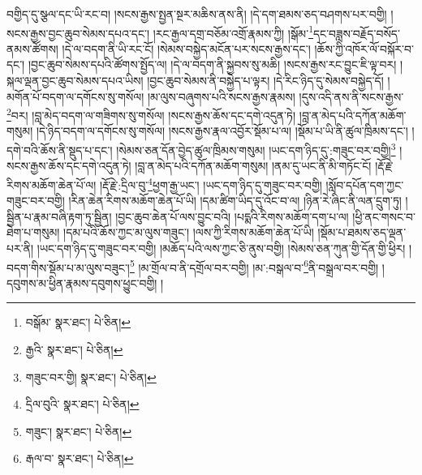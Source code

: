 བགྱིད་དུ་སྩལ་དང་ཡི་རང་བ། །སངས་རྒྱས་སྤྱན་སྔར་མཆིས་ནས་ནི། །དེ་དག་ཐམས་ཅད་བཤགས་པར་བགྱི། །སངས་རྒྱས་བྱང་ཆུབ་སེམས་དཔའ་དང་། །རང་རྒྱལ་དགྲ་བཅོམ་འགྲོ་རྣམས་ཀྱི། །སྒོམ་\footnote{བསྒོམ་  སྣར་ཐང་།  པེ་ཅིན། }དང་བཟླས་བརྗོད་བསོད་ནམས་ཚོགས། །དེ་ལ་བདག་ནི་ཡི་རང་ངོ། །སེམས་བསྐྱེད་མངོན་པར་སངས་རྒྱས་དང་། །ཆོས་ཀྱི་འཁོར་ལོ་བསྐོར་བ་དང་། །བྱང་ཆུབ་སེམས་དཔའི་ཚོགས་སྤྱོད་ལ། །དེ་ལ་བདག་ནི་སྐྱབས་སུ་མཆི། །སངས་རྒྱས་རང་བྱུང་ཇི་ལྟ་བར། །སྐལ་ལྡན་བྱང་ཆུབ་སེམས་དཔའ་ཡིས། །བྱང་ཆུབ་སེམས་ནི་བསྐྱེད་པ་ལྟར། །དེ་རིང་ཉིད་དུ་སེམས་བསྐྱེད་དོ། །མགོན་པོ་བདག་ལ་དགོངས་སུ་གསོལ། །མ་ལུས་བཞུགས་པའི་སངས་རྒྱས་རྣམས། །དུས་འདི་ནས་ནི་སངས་རྒྱས་\footnote{རྒྱའི་  སྣར་ཐང་།  པེ་ཅིན། }བར། །བླ་མེད་བདག་ལ་གཟིགས་སུ་གསོལ། །སངས་རྒྱས་ཆོས་དང་དགེ་འདུན་ཏེ། །བླ་ན་མེད་པའི་དཀོན་མཆོག་གསུམ། །དེ་ཉིད་བདག་ལ་དགོངས་སུ་གསོལ། །སངས་རྒྱས་རྣལ་འབྱོར་སྡོམ་པ་ལ། །སྡོམ་པ་ཡི་ནི་ཚུལ་ཁྲིམས་དང་། །དགེ་བའི་ཆོས་ནི་སྡུད་པ་དང་། །སེམས་ཅན་དོན་བྱེད་ཚུལ་ཁྲིམས་གསུམ། །ཡང་དག་ཉིད་དུ་:གཟུང་བར་བགྱི།\footnote{གཟུང་བར་གྱི།  སྣར་ཐང་།  པེ་ཅིན། } །སངས་རྒྱས་ཆོས་དང་དགེ་འདུན་ཏེ། །བླ་ན་མེད་པའི་དཀོན་མཆོག་གསུམ། །ནམ་དུ་ཡང་ནི་མི་གཏོང་ངོ། །རྡོ་རྗེ་རིགས་མཆོག་ཆེན་པོ་ལ། །རྡོ་རྗེ་:དྲིལ་བུ་\footnote{དྲིལ་བུའི་  སྣར་ཐང་།  པེ་ཅིན། }ཕྱག་རྒྱ་ཡང་། །ཡང་དག་ཉིད་དུ་གཟུང་བར་བགྱི། །སློབ་དཔོན་དག་ཀྱང་གཟུང་བར་བགྱི། །རིན་ཆེན་རིགས་མཆོག་ཆེན་པོ་ཡི། །དམ་ཚིག་ཡིད་དུ་འོང་བ་ལ། །ཉིན་རེ་ཞིང་ནི་ལན་དྲུག་ཏུ། །སྦྱིན་པ་རྣམ་བཞི་རྟག་ཏུ་སྦྱིན། །བྱང་ཆུབ་ཆེན་པོ་ལས་བྱུང་བའི། །པདྨའི་རིགས་མཆོག་དག་པ་ལ། །ཕྱི་ནང་གསང་བ་ཐེག་པ་གསུམ། །དམ་པའི་ཆོས་ཀྱང་མ་ལུས་གཟུང་། །ལས་ཀྱི་རིགས་མཆོག་ཆེན་པོ་ཡི། །སྡོམ་པ་ཐམས་ཅད་ལྡན་པར་ནི། །ཡང་དག་ཉིད་དུ་གཟུང་བར་བགྱི། །མཆོད་པའི་ལས་ཀྱང་ཅི་ནུས་བགྱི། །སེམས་ཅན་ཀུན་གྱི་དོན་གྱི་ཕྱིར། །བདག་གིས་སྡོམ་པ་མ་ལུས་བཟུང་།\footnote{གཟུང་།  སྣར་ཐང་།  པེ་ཅིན། } །མ་གྲོལ་བ་ནི་དགྲོལ་བར་བགྱི། །མ་:བསྒལ་བ་\footnote{རྒལ་བ་  སྣར་ཐང་།  པེ་ཅིན། }ནི་བསྒྲལ་བར་བགྱི། །དབུགས་མ་ཕྱིན་རྣམས་དབུགས་ཕྱུང་བགྱི། །
